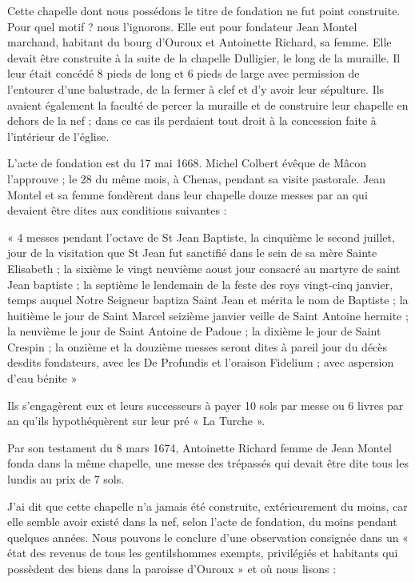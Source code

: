 Cette chapelle dont nous possédons le titre de fondation ne fut point construite. Pour quel motif ? nous l'ignorons. Elle eut pour fondateur Jean Montel marchand, habitant du bourg d'Ouroux et Antoinette
Richard, sa femme. Elle devait être construite à la suite de la chapelle Dulligier, le long de la muraille. Il leur était concédé 8 pieds de long et 6 pieds de large avec permission de l'entourer d'une balustrade, de la fermer à clef et d'y avoir leur sépulture. Ils avaient également la faculté de percer la muraille et de construire leur chapelle en dehors de la nef ; dans ce cas ils perdaient tout droit à la concession faite à l'intérieur de l'église.

L'acte de fondation est du 17 mai 1668. Michel Colbert évêque de Mâcon l'approuve ; le 28 du même mois, à Chenas, pendant sa visite pastorale. Jean Montel et sa femme fondèrent dans leur chapelle douze messes par an qui devaient être dites aux conditions suivantes :

« 4 messes pendant l'octave de St Jean Baptiste, la cinquième le second juillet, jour de la visitation que St Jean fut sanctifié dans le sein de sa mère Sainte Elisabeth ; la sixième le vingt neuvième aoust jour consacré au martyre de saint Jean baptiste ; la septième le lendemain de la feste des roys vingt-cinq janvier, temps auquel Notre Seigneur baptiza Saint Jean et mérita le nom de Baptiste ; la huitième le jour de Saint Marcel seizième janvier veille de Saint Antoine hermite ; la neuvième le jour de Saint Antoine de Padoue ; la dixième le jour de Saint Crespin ; la onzième et la douzième messes seront dites à pareil jour du décès desdits fondateurs, avec les De Profundis et l'oraison Fidelium ; avec aspersion d'eau bénite »

Ils s'engagèrent eux et leurs successeurs à payer 10 sols par messe ou 6 livres par an qu'ils hypothéquèrent sur leur pré « La Turche ».

Par son testament du 8 mars 1674, Antoinette Richard femme de Jean Montel fonda dans la même chapelle, une messe des trépassés qui devait être dite tous les lundis au prix de 7 sols.

J'ai dit que cette chapelle n'a jamais été construite, extérieurement du moins, car elle semble avoir existé dans la nef, selon l'acte de fondation, du moins pendant quelques années. Nous pouvons le conclure d'une observation consignée dans un « état des revenus de tous les gentilshommes exempts, privilégiés et habitants qui possèdent des biens dans la paroisse d'Ouroux » et où nous lisons :

